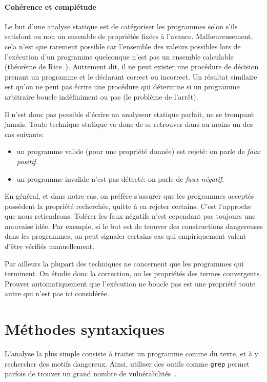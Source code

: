 \paragraph{Cohérence et complétude}

Le but d'une analyse statique est de catégoriser les programmes selon s'ils
satisfont ou non un ensemble de propriétés fixées à l'avance. Malheureusement,
cela n'est que rarement possible car l'ensemble des valeurs possibles lors de
l'exécution d'un programme quelconque n'est pas un ensemble calculable (théorème
de Rice~\cite{rice}). Autrement dit, il ne peut exister une procédure de
décision prenant un programme et le déclarant correct ou incorrect. Un résultat
similaire est qu'on ne peut pas écrire une procédure qui détermine si un
programme arbitraire boucle indéfiniment ou pas (le problème de l'arrêt).

Il n'est donc pas possible d'écrire un analyseur statique parfait, ne se
trompant jamais. Toute technique statique va donc de se retrouver dans au moins
un des cas suivants:

\begin{itemize}
\item
  un programme valide (pour une propriété donnée) est rejeté: on parle de
  \emph{faux positif}.
\item
  un programme invalide n'est pas détecté: on parle de
  \emph{faux négatif}.
\end{itemize}

En général, et dans notre cas, on préfère s'assurer que les programmes acceptés
possèdent la propriété recherchée, quitte à en rejeter certains. C'est
l'approche que nous retiendrons. Tolérer les faux négatifs n'est cependant pas
toujours une mauvaise idée. Par exemple, si le but est de trouver des
constructions dangereuses dans les programmes, on peut signaler certains cas qui
empiriquement valent d'être vérifiés manuellement.

Par ailleurs la plupart des techniques ne concernent que les programmes qui
terminent. On étudie donc la correction, ou les propriétés des termes
convergents. Prouver automatiquement que l'exécution ne boucle pas est une
propriété toute autre qui n'est pas ici considérée.

\section{Méthodes syntaxiques}

L'analyse la plus simple consiste à traiter un programme comme du texte, et à y
rechercher des motifs dangereux. Ainsi, utiliser des outils comme \texttt{grep}
permet parfois de trouver un grand nombre de vulnérabilités~\cite{SpenderGrep}.


